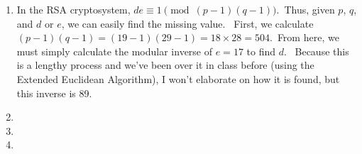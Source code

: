 \documentclass[12pt,letterpaper]{article}
\begin{document}
\pagestyle{fancy}
\rhead{\today}

\begin{enumerate}

    \item
        In the RSA cryptosystem, $de\equiv 1 \pmod {(p-1)(q-1)}$.~Thus, given $p$, $q$, and $d$ or $e$, we can easily find the missing value.~
        First, we calculate $(p-1)(q-1) = (19-1)(29-1) = 18\times28 = 504$.~From here, we must simply calculate the modular inverse of $e = 17$ to find $d$.~
        Because this is a lengthy process and we've been over it in class before (using the Extended Euclidean Algorithm), I won't elaborate on how it is found, but this inverse is 89.

    \item

    \item

    \item


\end{enumerate}
\end{document}
